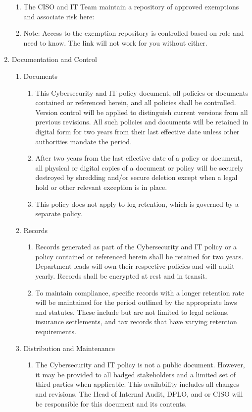 \documentclass[../main.tex]{subfiles}
\begin{document}
\begin{enumerate}
\begin{enumerate}
    \item The CISO and IT Team maintain a repository of approved exemptions and associate risk here: \ExceptionsRegistry
    \item Note: Access to the exemption repository is controlled based on role and need to know. The link will not work for you without either.
  \end{enumerate}
  \item Documentation and Control
  \begin{enumerate}
    \item Documents
    \begin{enumerate}
        \item This Cybersecurity and IT policy document, all policies or documents contained or referenced herein, and all \CompanyName policies shall be controlled. Version control will be applied to distinguish current versions from all previous revisions. All such policies and documents will be retained in digital form for two years from their last effective date unless other authorities mandate the period.
        \item After two years from the last effective date of a policy or document, all physical or digital copies of a document or policy will be securely destroyed by shredding and/or secure deletion except when a legal hold or other relevant exception is in place.
        \item This policy does not apply to log retention, which is governed by a separate policy.
      \end{enumerate}
  \item Records
  \begin{enumerate}
    \item Records generated as part of the Cybersecurity and IT policy or a policy contained or referenced herein shall be retained for two years. Department leads will own their respective policies and will audit yearly. Records shall be encrypted at rest and in transit.
    \item To maintain compliance, specific records with a longer retention rate will be maintained for the period outlined by the appropriate laws and statutes. These include but are not limited to legal actions, insurance settlements, and tax records that have varying retention requirements.
  \end{enumerate}
  \item Distribution and Maintenance
  \begin{enumerate}
    \item The Cybersecurity and IT policy is not a public document. However, it may be provided to all badged stakeholders and a limited set of third parties when applicable. This availability includes all changes and revisions. The Head of Internal Audit, DPLO, and or CISO will be responsible for this document and its contents.

\end{enumerate}
\end{enumerate}
\end{enumerate}
\end{document}
